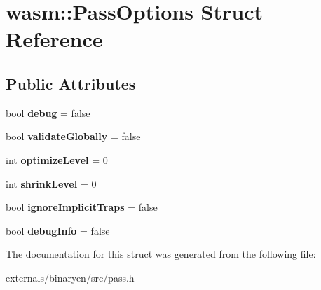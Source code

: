 \hypertarget{structwasm_1_1_pass_options}{}\section{wasm\+:\+:Pass\+Options Struct Reference}
\label{structwasm_1_1_pass_options}
\subsection*{Public Attributes}
\begin{DoxyCompactItemize}
\item 
\mbox{\label{structwasm_1_1_pass_options_a68ec2899a8da4226aaf023af0068c874}} 
bool {\bfseries debug} = false
\item 
\mbox{\label{structwasm_1_1_pass_options_a2d9aa57983d678d1c6426752fcbb3d09}} 
bool {\bfseries validate\+Globally} = false
\item 
\mbox{\label{structwasm_1_1_pass_options_a33c4a2e34fc838849f020a51e79ff4ed}} 
int {\bfseries optimize\+Level} = 0
\item 
\mbox{\label{structwasm_1_1_pass_options_a66d23e1d6e618ba3b6ab7e6d165faf93}} 
int {\bfseries shrink\+Level} = 0
\item 
\mbox{\label{structwasm_1_1_pass_options_a0ec32b7f74d9e91ca13737fdf9d33995}} 
bool {\bfseries ignore\+Implicit\+Traps} = false
\item 
\mbox{\label{structwasm_1_1_pass_options_a5ff954dd8d936c4b51a7f7f67064fc53}} 
bool {\bfseries debug\+Info} = false
\end{DoxyCompactItemize}


The documentation for this struct was generated from the following file\+:\begin{DoxyCompactItemize}
\item 
externals/binaryen/src/pass.\+h\end{DoxyCompactItemize}
